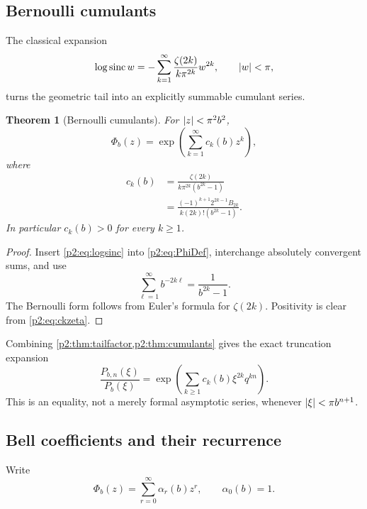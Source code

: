 \documentclass[11pt,oneside]{article}
\numberwithin{equation}{section}
\newtheorem{theorem}{Theorem}[section]
\theoremstyle{definition}
\theoremstyle{remark}
\newcommand{\sinc}{\operatorname{sinc}}
\begin{document}
\subsection{Bernoulli cumulants}

The classical expansion
\begin{equation}
 \log\sinc w=-\sum_{k=1}^{\infty}
 \frac{\zeta(2k)}{k\pi^{2k}}w^{2k},\qquad \abs w<\pi,
 \label{p2:eq:logsinc}
\end{equation}
turns the geometric tail into an explicitly summable cumulant series.

\begin{theorem}[Bernoulli cumulants]
\label{p2:thm:cumulants}
For \(\left\lvert z\right\rvert<\pi^2b^2\),
\begin{equation}
 \Phi_b(z)=\exp\!\left(\sum_{k=1}^{\infty}c_k(b)z^k\right),
 \label{p2:eq:PhiCumulant}
\end{equation}
where
\begin{align}
 c_k(b)
 &=\frac{\zeta(2k)}{k\pi^{2k}(b^{2k}-1)}
 \label{p2:eq:ckzeta}\\
 &=\frac{(-1)^{k+1}2^{2k-1}B_{2k}}
 {k(2k)!(b^{2k}-1)}.
 \label{p2:eq:ckBernoulli}
\end{align}
In particular \(c_k(b)>0\) for every \(k\geq1\).
\end{theorem}

\begin{proof}
Insert \eqref{p2:eq:logsinc} into \eqref{p2:eq:PhiDef}, interchange absolutely
convergent sums, and use
\[
 \sum_{\ell=1}^{\infty}b^{-2k\ell}=\frac1{b^{2k}-1}.
\]
The Bernoulli form follows from Euler's formula for \(\zeta(2k)\). Positivity is
clear from \eqref{p2:eq:ckzeta}.
\end{proof}

Combining \cref{p2:thm:tailfactor,p2:thm:cumulants} gives the exact truncation expansion
\begin{equation}
 \frac{P_{b,n}(\xi)}{P_b(\xi)}
 =\exp\!\left(\sum_{k\geq1}c_k(b)\xi^{2k}q^{kn}\right).
 \label{p2:eq:tailn}
\end{equation}
This is an equality, not a merely formal asymptotic series, whenever
\(\left\lvert \xi\right\rvert<\pi b^{n+1}\).

\subsection{Bell coefficients and their recurrence}

Write
\begin{equation}
 \Phi_b(z)=\sum_{r=0}^{\infty}\alpha_r(b)z^r,
 \qquad \alpha_0(b)=1.
 \label{p2:eq:alphadef}
\end{equation}
\end{document}
